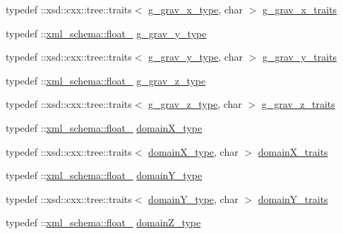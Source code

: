\begin{DoxyCompactItemize}
\item 
typedef \+::xsd\+::cxx\+::tree\+::traits$<$ \hyperlink{classsetting__t_af2a0b22be63f361de8ba6df7313b1a68}{g\+\_\+grav\+\_\+x\+\_\+type}, char $>$ \hyperlink{classsetting__t_a6a6c41b916afaf5875cef8b3725c41cf}{g\+\_\+grav\+\_\+x\+\_\+traits}
\item 
typedef \+::\hyperlink{namespacexml__schema_ad7e04ab17bba0b3fdde43fb79ef6ed87}{xml\+\_\+schema\+::float\+\_\+} \hyperlink{classsetting__t_a89b3c653de2dc5afa902042e34939589}{g\+\_\+grav\+\_\+y\+\_\+type}
\item 
typedef \+::xsd\+::cxx\+::tree\+::traits$<$ \hyperlink{classsetting__t_a89b3c653de2dc5afa902042e34939589}{g\+\_\+grav\+\_\+y\+\_\+type}, char $>$ \hyperlink{classsetting__t_ae11d083a1b0c3194a4295bdc5fd79a32}{g\+\_\+grav\+\_\+y\+\_\+traits}
\item 
typedef \+::\hyperlink{namespacexml__schema_ad7e04ab17bba0b3fdde43fb79ef6ed87}{xml\+\_\+schema\+::float\+\_\+} \hyperlink{classsetting__t_a2a9e06e642160debeeadb7a76b97c753}{g\+\_\+grav\+\_\+z\+\_\+type}
\item 
typedef \+::xsd\+::cxx\+::tree\+::traits$<$ \hyperlink{classsetting__t_a2a9e06e642160debeeadb7a76b97c753}{g\+\_\+grav\+\_\+z\+\_\+type}, char $>$ \hyperlink{classsetting__t_ab6a6497ea3d399fee80102fc84d04397}{g\+\_\+grav\+\_\+z\+\_\+traits}
\item 
typedef \+::\hyperlink{namespacexml__schema_ad7e04ab17bba0b3fdde43fb79ef6ed87}{xml\+\_\+schema\+::float\+\_\+} \hyperlink{classsetting__t_a1bf57fd62042e86d0e1e66f34fbaed31}{domain\+X\+\_\+type}
\item 
typedef \+::xsd\+::cxx\+::tree\+::traits$<$ \hyperlink{classsetting__t_a1bf57fd62042e86d0e1e66f34fbaed31}{domain\+X\+\_\+type}, char $>$ \hyperlink{classsetting__t_ab34396042c375f062bd2d6f062e15e67}{domain\+X\+\_\+traits}
\item 
typedef \+::\hyperlink{namespacexml__schema_ad7e04ab17bba0b3fdde43fb79ef6ed87}{xml\+\_\+schema\+::float\+\_\+} \hyperlink{classsetting__t_a9f13bfe9cc42660cf1e89cff4afe9435}{domain\+Y\+\_\+type}
\item 
typedef \+::xsd\+::cxx\+::tree\+::traits$<$ \hyperlink{classsetting__t_a9f13bfe9cc42660cf1e89cff4afe9435}{domain\+Y\+\_\+type}, char $>$ \hyperlink{classsetting__t_a9c732c5a7483b203f6f456a57de341ed}{domain\+Y\+\_\+traits}
\item 
typedef \+::\hyperlink{namespacexml__schema_ad7e04ab17bba0b3fdde43fb79ef6ed87}{xml\+\_\+schema\+::float\+\_\+} \hyperlink{classsetting__t_a2257367cc1475e2a9b1b2a82dbdaddaf}{domain\+Z\+\_\+type}

\end{DoxyCompactItemize}

